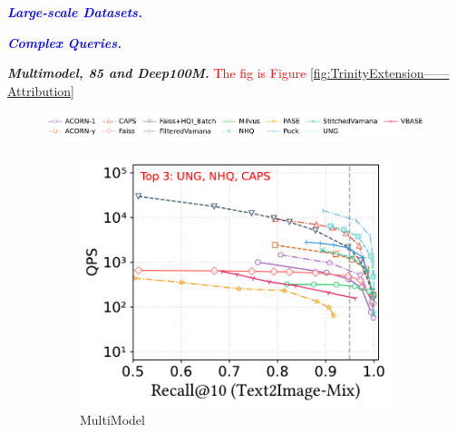 \documentclass[sigconf, nonacm]{acmart}
\begin{document}
	\textit{\textbf{\textcolor{blue}{Large-scale Datasets.}}} 
	
	\textit{\textbf{\textcolor{blue}{Complex Queries.}}}
	
	
	\textit{\textbf{Multimodel, 85 and Deep100M.}} \textcolor{red}{The fig is Figure \ref{fig:TrinityExtension——Attribution}}
	
	\begin{figure}[t]
		\centering
		
		
		\hspace*{5pt}
		\includegraphics[width=0.98\columnwidth]{figures/exp/attribute_legend.pdf}
		
		\begin{subfigure}[t]{0.332\columnwidth}
			\centering
			\captionsetup{font=small}
			\includegraphics[width=\linewidth]{figures/exp/attribute_multimodel.pdf}
			\caption{\footnotesize MultiModel}
			\label{fig:rangeFilter_build_time}
		\end{subfigure}
		\hfill
		\begin{subfigure}[t]{0.315\columnwidth}
			\centering

\end{subfigure}
\end{figure}
\end{document}
